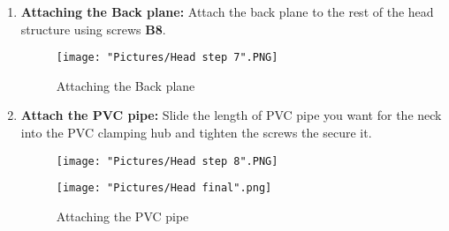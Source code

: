 \documentclass[12pt]{article}
\begin{document}
\begin{enumerate}
	\item \textbf{Attaching the Back plane:} Attach the back plane to the rest of the head structure using screws \textbf{B8}. 

\begin{figure}[H]
	\centering
	\texttt{[image: "Pictures/Head step 7".PNG]}
	\caption{Attaching the Back plane}
\end{figure}

	\item \textbf{Attach the PVC pipe:} Slide the length of PVC pipe you want for the neck into the PVC clamping hub and tighten the screws the secure it.

\begin{figure}[H]
	\centering
  	\begin{minipage}[b]{0.45\textwidth}
		\texttt{[image: "Pictures/Head step 8".PNG]}
  	\end{minipage}
  	\hfill
  	\begin{minipage}[b]{0.45\textwidth}
    		\texttt{[image: "Pictures/Head final".png]}
  	\end{minipage}
  	\caption{Attaching the PVC pipe}
  	\label{pvc}
\end{figure}

\end{enumerate}
\end{document}
